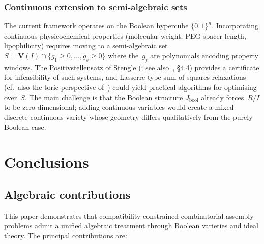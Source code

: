 \documentclass[preprint,12pt]{elsarticle}
\theoremstyle{definition}
\theoremstyle{remark}
\newcommand{\Var}{\mathbf{V}}
\begin{document}
\subsubsection{Continuous extension to semi-algebraic sets}

The current framework operates on the Boolean hypercube
$\{0,1\}^n$.  Incorporating continuous physicochemical properties
(molecular weight, PEG spacer length, lipophilicity) requires
moving to a semi-algebraic set
$S = \Var(I) \cap \{g_1 \geq 0, \ldots, g_s \geq 0\}$
where the~$g_j$ are polynomials encoding property windows.
The Positivstellensatz of Stengle (\cite{Stengle74};
see also~\cite{BCR98}, \S4.4) provides a certificate for
infeasibility of such systems, and Lasserre-type
sum-of-squares relaxations~\cite{Lasserre01} (cf.~also the toric
perspective of~\cite{Sturmfels96}) could yield practical algorithms
for optimising over~$S$.  The main challenge is that the Boolean
structure $J_{\mathrm{bool}}$ already forces~$R/I$ to be
zero-dimensional; adding continuous variables would create a
mixed discrete-continuous variety whose geometry differs
qualitatively from the purely Boolean case.


\section{Conclusions}\label{sec:conclusions}

\subsection{Algebraic contributions}

This paper demonstrates that compatibility-constrained combinatorial
assembly problems admit a unified algebraic treatment through Boolean
varieties and ideal theory.  The principal contributions are:
\end{document}

